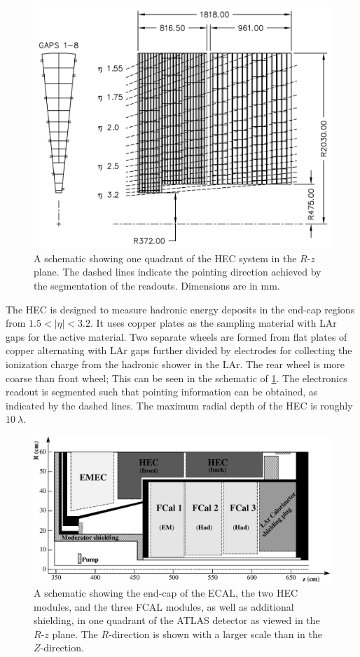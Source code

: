\begin{figure}[ht] 
\centering
\includegraphics[width=.7\textwidth]{figures/atlas/hec.pdf}
\caption{ A schematic showing one quadrant of the 
HEC system in the $R$-$z$ plane. The dashed lines indicate
the pointing direction achieved by the segmentation of the 
readouts.  Dimensions are in mm.  }
\label{fig:atlas_hec}
\end{figure}


The HEC is designed to measure hadronic energy deposits in the 
end-cap regions from $1.5 < |\eta|< 3.2$. It uses 
copper plates as the sampling material with LAr gaps
for the active material. Two separate wheels are formed from
flat plates of copper alternating with LAr gaps further divided by electrodes for
collecting the ionization charge from the hadronic shower in the LAr.
The rear wheel is more coarse than front wheel;
This can be seen in the schematic of \fig\ref{fig:atlas_hec}.
The electronics readout is segmented such that pointing information
can be obtained, as indicated by the dashed lines.
The maximum radial depth of the HEC is roughly $10~\lambda$.



\begin{figure}[ht] 
\centering
\includegraphics[width=.7\textwidth]{figures/atlas/fcal.eps}
\caption{ A schematic showing the end-cap of the ECAL,
the two HEC modules, and the three FCAL modules, as well
as additional shielding, in one
quadrant of the ATLAS detector as viewed 
in the $R$-$z$ plane.
The $R$-direction is shown with a larger scale than in the $Z$-direction.
}
\label{fig:atlas_fcal}
\end{figure}


